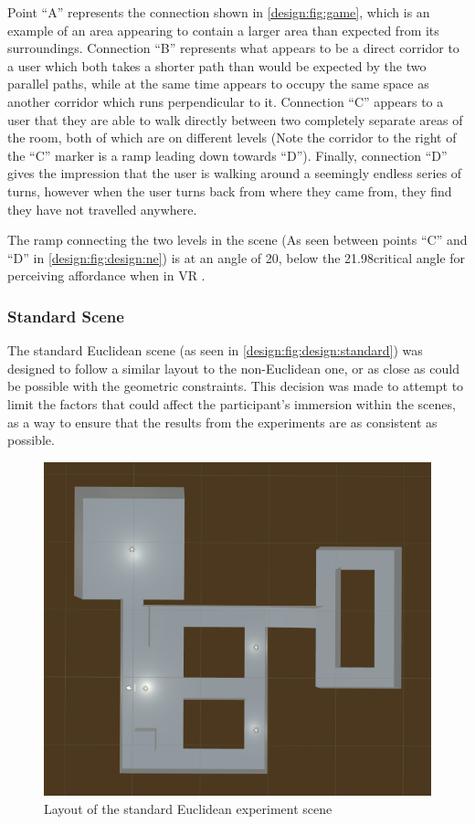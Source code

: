 			Point \enquote{A} represents the connection shown in \autoref{design:fig:game}, which is an example of an area appearing to contain a larger area than expected from its surroundings.
			Connection \enquote{B} represents what appears to be a direct corridor to a user which both takes a shorter path than would be expected by the two parallel paths, while at the same time appears to occupy the same space as another corridor which runs perpendicular to it.
			Connection \enquote{C} appears to a user that they are able to walk directly between two completely separate areas of the room, both of which are on different levels (Note the corridor to the right of the \enquote{C} marker is a ramp leading down towards \enquote{D}).
			Finally, connection \enquote{D} gives the impression that the user is walking around a seemingly endless series of turns, however when the user turns back from where they came from, they find they have not travelled anywhere.

			The ramp connecting the two levels in the scene (As seen between points \enquote{C} and \enquote{D} in \autoref{design:fig:design:ne}) is at an angle of 20\degree, below the 21.98\degree critical angle for perceiving affordance when in VR \cite{Regia-Corte2012}.

		\subsubsection{Standard Scene}
			The standard Euclidean scene (as seen in \autoref{design:fig:design:standard}) was designed to follow a similar layout to the non-Euclidean one, or as close as could be possible with the geometric constraints.
			This decision was made to attempt to limit the factors that could affect the participant's immersion within the scenes, as a way to ensure that the results from the experiments are as consistent as possible.

			\begin{figure}[H]
				\includegraphics[width=1\textwidth]{Images/Standard_Layout}
				\centering
				\caption{Layout of the standard Euclidean experiment scene}
				\label{design:fig:design:standard}
			\end{figure}
